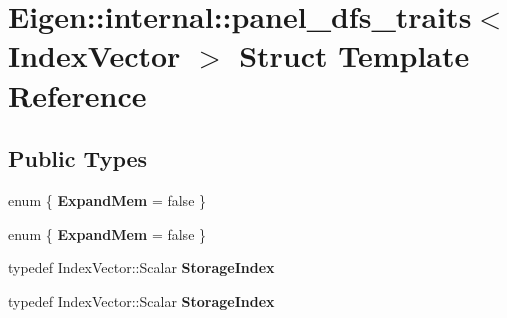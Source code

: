 \hypertarget{struct_eigen_1_1internal_1_1panel__dfs__traits}{}\section{Eigen\+:\+:internal\+:\+:panel\+\_\+dfs\+\_\+traits$<$ Index\+Vector $>$ Struct Template Reference}
\label{struct_eigen_1_1internal_1_1panel__dfs__traits}
\subsection*{Public Types}
\begin{DoxyCompactItemize}
\item 
\mbox{\label{struct_eigen_1_1internal_1_1panel__dfs__traits_a18e9bea47b80bdd4e2d726a0be455fe8}} 
enum \{ {\bfseries Expand\+Mem} = false
 \}
\item 
\mbox{\label{struct_eigen_1_1internal_1_1panel__dfs__traits_a65f633787574d0cc6483450124a541e0}} 
enum \{ {\bfseries Expand\+Mem} = false
 \}
\item 
\mbox{\label{struct_eigen_1_1internal_1_1panel__dfs__traits_ac2c2ba4aabe69f4f9ed0fa2d4e5a243f}} 
typedef Index\+Vector\+::\+Scalar {\bfseries Storage\+Index}
\item 
\mbox{\label{struct_eigen_1_1internal_1_1panel__dfs__traits_ac2c2ba4aabe69f4f9ed0fa2d4e5a243f}} 
typedef Index\+Vector\+::\+Scalar {\bfseries Storage\+Index}
\end{DoxyCompactItemize}
